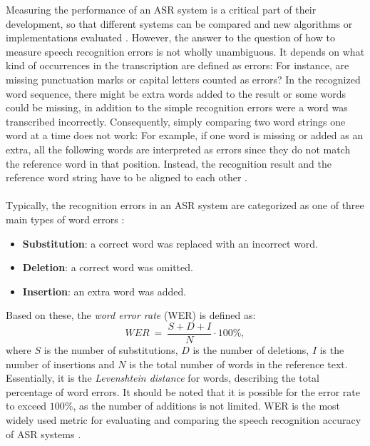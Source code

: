 \documentclass[english, 12pt, a4paper, pdftex, elec, utf8]{aaltothesis}
\begin{document}
Measuring the performance of an ASR system is a critical part of their development, so that different systems can be compared and new algorithms or implementations evaluated \cite{huang2001spoken}. However, the answer to the question of how to measure speech recognition errors is not wholly unambiguous. It depends on what kind of occurrences in the transcription are defined as errors: For instance, are missing punctuation marks or capital letters counted as errors? In the recognized word sequence, there might be extra words added to the result or some words could be missing, in addition to the simple recognition errors were a word was transcribed incorrectly. Consequently, simply comparing two word strings one word at a time does not work: For example, if one word is missing or added as an extra, all the following words are interpreted as errors since they do not match the reference word in that position. Instead, the recognition result and the reference word string have to be aligned to each other \cite{huang2001spoken}. \\\\
Typically, the recognition errors in an ASR system are categorized as one of three main types of word errors \cite[p.~420]{huang2001spoken}:
\vspace{2mm}
\begin{itemize}[itemsep=2mm]
	\item \textbf{Substitution}: a correct word was replaced with an incorrect word.
	\item \textbf{Deletion}: a correct word was omitted.
	\item \textbf{Insertion}: an extra word was added.
\end{itemize}
\vspace{2mm}
Based on these, the \textit{word error rate} (WER) is defined as:
\begin{equation}
WER \ = \ \frac{S + D + I}{N} \cdot 100\%,
\end{equation}
where $S$ is the number of substitutions, $D$ is the number of deletions, $I$ is the number of insertions and $N$ is the total number of words in the reference text. Essentially, it is the \textit{Levenshtein distance} for words, describing the total percentage of word errors. It should be noted that it is possible for the error rate to exceed $100\%$, as the number of additions is not limited. WER is the most widely used metric for evaluating and comparing the speech recognition accuracy of ASR systems \cite{huang2001spoken, kallasjoki2016}. \\\\
\end{document}
